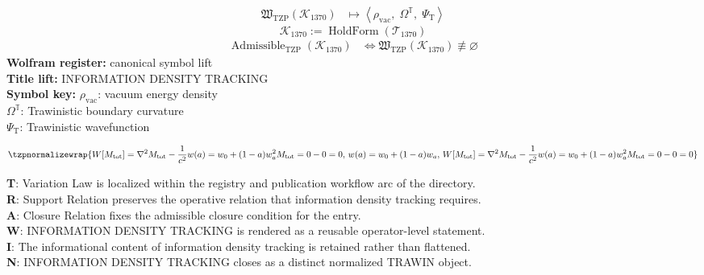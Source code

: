 \noindent
\begin{minipage}[t]{0.48\linewidth}
\begingroup
\small
\[
\begin{aligned}
\mathfrak{W}_{\mathrm{TZP}}\!\left(\mathcal{K}_{1370}\right)
&\longmapsto
\left\langle \rho_{\mathrm{vac}},\; \Omega^{\mathbb{T}},\; \Psi_{\mathrm{T}} \right\rangle
\end{aligned}
\]
\[
\mathcal{K}_{1370}
:=
\operatorname{HoldForm}\!\left(\mathcal{T}_{1370}\right)
\]
\[
\begin{aligned}
\operatorname{Admissible}_{\mathrm{TZP}}\!\left(\mathcal{K}_{1370}\right)
&\Longleftrightarrow
\mathfrak{W}_{\mathrm{TZP}}\!\left(\mathcal{K}_{1370}\right)\not\equiv\varnothing
\end{aligned}
\]
\textbf{Wolfram register:} canonical symbol lift\\
\textbf{Title lift:} INFORMATION DENSITY TRACKING\\
\textbf{Symbol key:} \(\rho_{\mathrm{vac}}\): vacuum energy density\\ \(\Omega^{\mathbb{T}}\): Trawinistic boundary curvature\\ \(\Psi_{\mathrm{T}}\): Trawinistic wavefunction
\par
\endgroup
\end{minipage}\hfill
\begin{minipage}[t]{0.48\linewidth}
\[
\tzpnormalizewrap{W[M_{\text{tot}}] = \nabla^2 M_{\text{tot}} - \frac{1}{c^2}w(a) = w_0 + (1-a)w_a^2 M_{\text{tot}} = 0 - 0 = 0,\,w(a) = w_0 + (1-a)w_a,\,W[M_{\text{tot}}] = \nabla^2 M_{\text{tot}} - \frac{1}{c^2}w(a) = w_0 + (1-a)w_a^2 M_{\text{tot}} = 0 - 0 = 0}
\]

\small
\textbf{T}: Variation Law is localized within the registry and publication workflow arc of the directory.\\
\textbf{R}: Support Relation preserves the operative relation that information density tracking requires.\\
\textbf{A}: Closure Relation fixes the admissible closure condition for the entry.\\
\textbf{W}: INFORMATION DENSITY TRACKING is rendered as a reusable operator-level statement.\\
\textbf{I}: The informational content of information density tracking is retained rather than flattened.\\
\textbf{N}: INFORMATION DENSITY TRACKING closes as a distinct normalized TRAWIN object.
\normalsize
\end{minipage}

